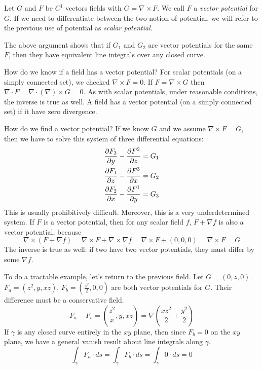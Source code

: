 \documentclass[fleqn,letterpaper]{report}
\begin{document}
\begin{defn}
Let $G$ and $F$ be $C^1$ vectors fields with $G = \nabla
\times F$. We call $F$ a \emph{vector potential} for $G$. If
we need to differentiate between the two notion of potential,
we will refer to the previous use of potential as \emph{scalar
potential}. 
\end{defn}

The above argument shows that if $G_1$ and $G_2$ are vector
potentials for the same $F$, then they have equivalent line
integrals over any closed curve. 

How do we know if a field has a vector potential? For scalar
potentials (on a simply connected set), we checked $\nabla
\times F =0$. If $F = \nabla \times G$ then $\nabla \cdot F =
\nabla \cdot (\nabla) \times G = 0$. As with scalar
potentials, under reasonable conditions, the inverse is true
as well. A field has a vector potential (on a simply
connected set) if it have zero divergence.

How do we find a vector potential? If we know $G$ and we
assume $\nabla \times F = G$, then we have to solve this
system of three differential equations:
\begin{align*}
\frac{\partial F_3}{\partial y} - \frac{\partial F^2}{\partial z} & = G_1 \\
\frac{\partial F_1}{\partial z} - \frac{\partial F^3}{\partial x} & = G_2 \\
\frac{\partial F_2}{\partial x} - \frac{\partial F^1}{\partial y} & = G_3
\end{align*}
This is usually prohibitively difficult. Moreover, this is a
very underdetermined system. If $F$ is a vector potential,
then for any scalar field $f$, $F + \nabla f$ is also a vector
potential, because 
\begin{equation*}
\nabla \times (F + \nabla f) = \nabla
\times F + \nabla \times \nabla f = \nabla \times F + (0,0,0)
= \nabla \times F = G
\end{equation*}
The inverse is true as well: if two have two vector
potentials, they must differ by some $\nabla f$. 

\begin{example}
To do a tractable example, let's return to the previous
field. Let $G = (0,z,0)$. $F_a = (z^2, y, xz)$, $F_b =
\left( \frac{z^2}{2}, 0, 0 \right)$ are both vector
potentials for $G$. Their difference must be a conservative
field. 
\begin{equation*}
F_a - F_b = \left( \frac{z^2}{x}, y, xz \right) = \nabla
\left( \frac{xz^2}{2} + \frac{y^2}{2} \right) 
\end{equation*}
If $\gamma$ is any closed curve entirely in the $xy$
plane, then since $F_b = 0$ on the $xy$ plane, we have a
general vanish result about line integrals along $\gamma$.
\begin{equation*}
\int_\gamma F_a \cdot ds = \int_\gamma F_b \cdot ds =
\int_\gamma 0 \cdot ds = 0
\end{equation*}
\end{example}
\end{document}
